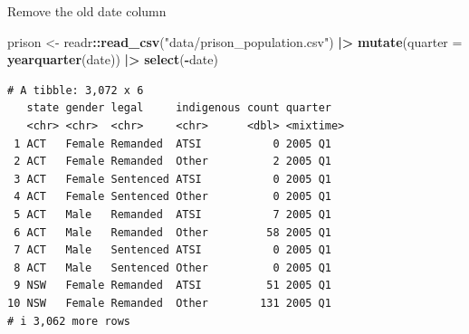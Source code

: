 \documentclass[
  14pt,
  ignorenonframetext,
  aspectratio=169,
]{beamer}
\newenvironment{Shaded}{\begin{snugshade}}{\end{snugshade}}
\newcommand{\AttributeTok}[1]{\textcolor[rgb]{0.13,0.29,0.53}{#1}}
\newcommand{\FunctionTok}[1]{\textcolor[rgb]{0.13,0.29,0.53}{\textbf{#1}}}
\newcommand{\NormalTok}[1]{#1}
\newcommand{\OtherTok}[1]{\textcolor[rgb]{0.56,0.35,0.01}{#1}}
\newcommand{\SpecialCharTok}[1]{\textcolor[rgb]{0.81,0.36,0.00}{\textbf{#1}}}
\newcommand{\StringTok}[1]{\textcolor[rgb]{0.31,0.60,0.02}{#1}}
\renewenvironment{Shaded}{\vspace*{0.15cm}\color{black}\fontsize{10}{10}\sf\begin{snugshade}\color{black}}{\end{snugshade}}
\begin{document}
\begin{frame}[fragile]{Remove the old date column}
\protect{}\label{remove-the-old-date-column}
\fontsize{10}{11}\sf

\begin{Shaded}
\begin{Highlighting}[]
\NormalTok{prison }\OtherTok{\textless{}{-}}\NormalTok{ readr}\SpecialCharTok{::}\FunctionTok{read\_csv}\NormalTok{(}\StringTok{"data/prison\_population.csv"}\NormalTok{) }\SpecialCharTok{|\textgreater{}}
  \FunctionTok{mutate}\NormalTok{(}\AttributeTok{quarter =} \FunctionTok{yearquarter}\NormalTok{(date)) }\SpecialCharTok{|\textgreater{}}
  \FunctionTok{select}\NormalTok{(}\SpecialCharTok{{-}}\NormalTok{date)}
\end{Highlighting}
\end{Shaded}

\begin{verbatim}
# A tibble: 3,072 x 6
   state gender legal     indigenous count quarter  
   <chr> <chr>  <chr>     <chr>      <dbl> <mixtime>
 1 ACT   Female Remanded  ATSI           0 2005 Q1  
 2 ACT   Female Remanded  Other          2 2005 Q1  
 3 ACT   Female Sentenced ATSI           0 2005 Q1  
 4 ACT   Female Sentenced Other          0 2005 Q1  
 5 ACT   Male   Remanded  ATSI           7 2005 Q1  
 6 ACT   Male   Remanded  Other         58 2005 Q1  
 7 ACT   Male   Sentenced ATSI           0 2005 Q1  
 8 ACT   Male   Sentenced Other          0 2005 Q1  
 9 NSW   Female Remanded  ATSI          51 2005 Q1  
10 NSW   Female Remanded  Other        131 2005 Q1  
# i 3,062 more rows
\end{verbatim}
\end{frame}
\end{document}
